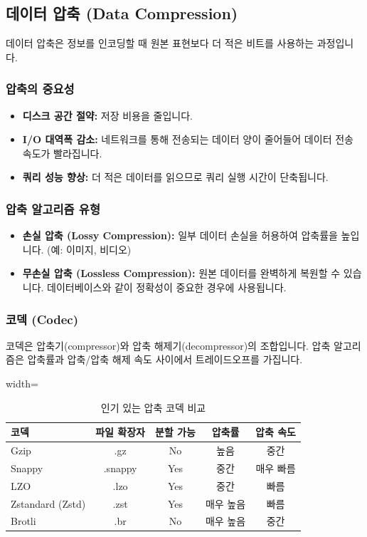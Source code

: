 \documentclass[11pt,a4paper]{article}
\begin{document}
\subsection{데이터 압축 (Data Compression)}
데이터 압축은 정보를 인코딩할 때 원본 표현보다 더 적은 비트를 사용하는 과정입니다.

\subsubsection{압축의 중요성}
\begin{itemize}
    \item \textbf{디스크 공간 절약:} 저장 비용을 줄입니다.
    \item \textbf{I/O 대역폭 감소:} 네트워크를 통해 전송되는 데이터 양이 줄어들어 데이터 전송 속도가 빨라집니다.
    \item \textbf{쿼리 성능 향상:} 더 적은 데이터를 읽으므로 쿼리 실행 시간이 단축됩니다.
\end{itemize}

\subsubsection{압축 알고리즘 유형}
\begin{itemize}
    \item \textbf{손실 압축 (Lossy Compression):} 일부 데이터 손실을 허용하여 압축률을 높입니다. (예: 이미지, 비디오)
    \item \textbf{무손실 압축 (Lossless Compression):} 원본 데이터를 완벽하게 복원할 수 있습니다. 데이터베이스와 같이 정확성이 중요한 경우에 사용됩니다.
\end{itemize}

\subsubsection{코덱 (Codec)}
코덱은 압축기(compressor)와 압축 해제기(decompressor)의 조합입니다. 압축 알고리즘은 압축률과 압축/압축 해제 속도 사이에서 트레이드오프를 가집니다.

\begin{table}[h!]
\centering
\caption{인기 있는 압축 코덱 비교}
\label{tab:compression_codecs}
\begin{adjustbox}{width=\textwidth}
\begin{tabular}{lcccc}
\toprule
\textbf{코덱} & \textbf{파일 확장자} & \textbf{분할 가능} & \textbf{압축률} & \textbf{압축 속도} \\
\midrule
Gzip & .gz & No & 높음 & 중간 \\
Snappy & .snappy & Yes & 중간 & 매우 빠름 \\
LZO & .lzo & Yes & 중간 & 빠름 \\
Zstandard (Zstd) & .zst & Yes & 매우 높음 & 빠름 \\
Brotli & .br & No & 매우 높음 & 중간 \\
\bottomrule
\end{tabular}
\end{adjustbox}
\end{table}
\end{document}
